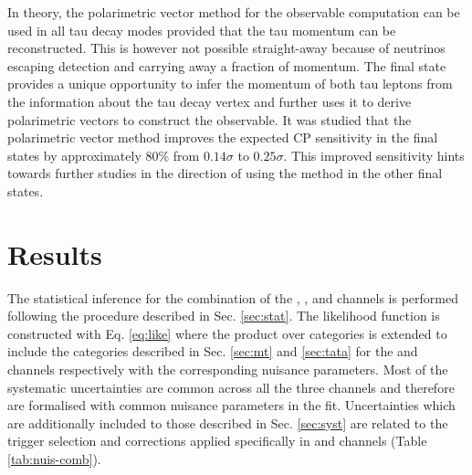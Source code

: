 In theory, the polarimetric vector method for the \phicp observable computation can be used in all tau decay modes provided that the tau momentum can be reconstructed. This is however not possible straight-away because of neutrinos escaping detection and carrying away a fraction of momentum. The \aaa final state provides a unique opportunity to infer the momentum of both tau leptons from the information about the tau decay vertex and further uses it to derive polarimetric vectors to construct the \phicp observable. It was studied that the polarimetric vector method improves the expected CP sensitivity in the \aaa final states by approximately 80\% from $0.14\sigma$ to $0.25\sigma$. This improved sensitivity hints towards further studies in the direction of using the method in the other final states.

\section{Results}\label{sec:comb_res}

The statistical inference for the combination of the \et, \mt, and \tata channels is performed following the procedure described in Sec. \ref{sec:stat}. The likelihood function is constructed with Eq. \ref{eq:like} where the product over categories is extended to include the categories described in Sec. \ref{sec:mt} and \ref{sec:tata} for the \mt and \tata channels respectively with the corresponding nuisance parameters. Most of the systematic uncertainties are common across all the three channels and therefore are formalised with common nuisance parameters in the fit. Uncertainties which are additionally included to those described in Sec. \ref{sec:syst} are related to the trigger selection and corrections applied specifically in \mt and \tata channels (Table \ref{tab:nuis-comb}).

